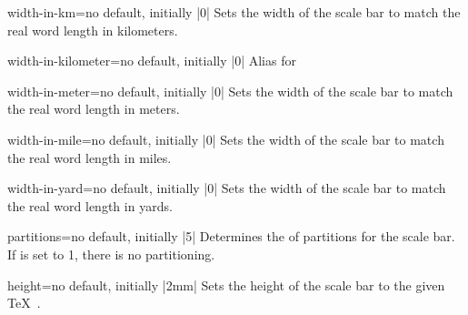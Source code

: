 \clearpage

\begin{docMrcKey}[scalebar]{width-in-km}{=}{no default, initially |0|}
  Sets the width of the scale bar to match the real word length 
  in kilometers.
\end{docMrcKey}

\begin{docMrcKey}[scalebar]{width-in-kilometer}{=}{no default, initially |0|}
  Alias for 
\end{docMrcKey}

\begin{docMrcKey}[scalebar]{width-in-meter}{=}{no default, initially |0|}
  Sets the width of the scale bar to match the real word length 
  in meters.
\end{docMrcKey}

\begin{docMrcKey}[scalebar]{width-in-mile}{=}{no default, initially |0|}
  Sets the width of the scale bar to match the real word length 
  in miles.
\end{docMrcKey}

\begin{docMrcKey}[scalebar]{width-in-yard}{=}{no default, initially |0|}
  Sets the width of the scale bar to match the real word length 
  in yards.
\end{docMrcKey}

\begin{docMrcKey}[scalebar]{partitions}{=}{no default, initially |5|}
  Determines the  of partitions for the scale bar. If 
  is set to 1, there is no partitioning.
\end{docMrcKey}

\begin{docMrcKey}[scalebar]{height}{=}{no default, initially |2mm|}
  Sets the height of the scale bar to the given \TeX\ .
\end{docMrcKey}


